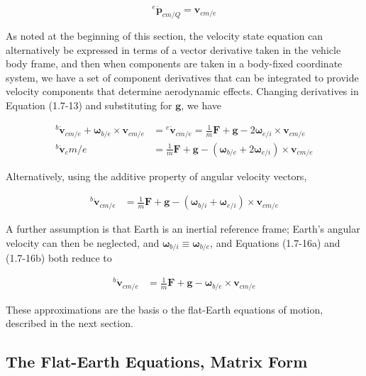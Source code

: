 \begin{equation*}\tag{1.7-15}
    {^{e}{\dot{\mathbf{p}}_{cm/Q}}} = \mathbf{v}_{cm/e}
\end{equation*}

    As noted at the beginning of this section, the velocity state equation can alternatively be expressed in terms of a vector derivative taken in the vehicle body frame, and then when components are taken in a body-fixed coordinate system, we have a set of component derivatives that can be integrated to provide velocity components that determine aerodynamic effects. Changing derivatives in Equation (1.7-13) and substituting for \(\mathbf{g}\), we have

\begin{align*}\tag{1.7-16a}
    {^{b}{\dot{\mathbf{v}}}_{cm/e}} + \mathbf{\omega}_{b/e} \times \mathbf{v}_{cm/e} &= {^{e}{\dot{\mathbf{v}}_{cm/e}}} = \textstyle{\frac{1}{m}}\mathbf{F} + \mathbf{g} - 2 \mathbf{\omega}_{e/i} \times \mathbf{v}_{cm/e} \\
{^{b}{\dot{\mathbf{v}}_cm/e}} &= \textstyle{\frac{1}{m}} \mathbf{F} + \mathbf{g} - \left( \mathbf{\omega}_{b/e} + 2 {\mathbf{\omega}_{e/i}}\right) \times \mathbf{v}_{cm/e}
\end{align*}

Alternatively, using the additive property of angular velocity vectors,

\begin{align*}\tag{1.7-16b}
    {^{b}{\dot{\mathbf{v}}_{cm/e}}} &= \textstyle{\frac{1}{m}} \mathbf{F} + \mathbf{g} - \left( \mathbf{\omega}_{b/i} + \mathbf{\omega}_{e/i} \right) \times \mathbf{v}_{cm/e}
\end{align*}

A further assumption is that Earth is an inertial reference frame; Earth's angular velocity can then be neglected, and \(\mathbf{\omega}_{b/i} \equiv \mathbf{\omega}_{b/e}\), and Equations (1.7-16a) and (1.7-16b) both reduce to

\begin{align*}\tag{1.7-16c}
    {^{b}{\dot{\mathbf{v}}_{cm/e}}} &= \textstyle{\frac{1}{m}} \mathbf{F} + \mathbf{g} - \mathbf{\omega}_{b/e} \times \mathbf{v}_{cm/e}
\end{align*}

These approximations are the basis o the flat-Earth equations of motion, described in the next section.

\subsection{The Flat-Earth Equations, Matrix Form}

